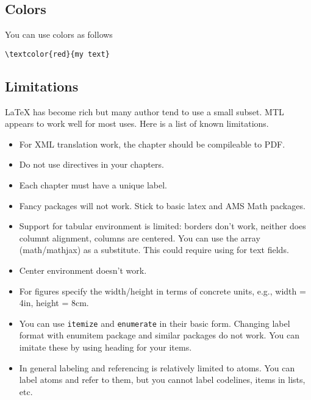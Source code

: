 \subsection{Colors}

You can use colors as follows
\begin{lstlisting}
\textcolor{red}{my text}
\end{lstlisting}

\subsection{Limitations}
\label{sec:mtl::limitations}

LaTeX has become rich but many author tend to use a small subset.  MTL appears to work well for most uses. Here is a list of known limitations.
\begin{itemize}

\item For XML translation work, the chapter should be compileable to PDF.

\item Do not use \lstinline`` directives in your chapters.

\item Each chapter must have a unique label.

\item Fancy packages will not work.  Stick to basic latex and AMS Math packages.

\item Support for tabular environment is limited: borders don't work, neither does columnt alignment, columns are centered.  You can use the array (math/mathjax) as a substitute.  This could require using \mbox{} for text fields.  
 
\item Center environment doesn't work.

\item For figures specify the width/height in terms of concrete units, e.g.,
  width = 4in, height = 8cm.

\item You can use \lstinline`itemize` and \lstinline`enumerate` in their basic form.  Changing label format with enumitem package and similar packages do not work.  You can imitate these by using heading for your items.  

\item In general labeling and referencing is relatively limited to atoms.  You can label atoms and refer to them, but you cannot label codelines, items in lists, etc.


\end{itemize}
